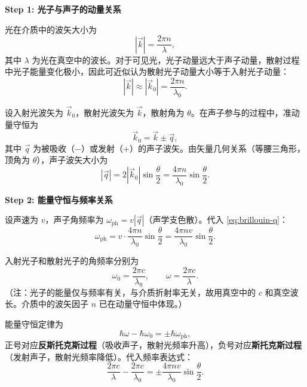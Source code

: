 \begin{derivationbox}[标准解题过程]
\textbf{Step 1: 光子与声子的动量关系}

光在介质中的波矢大小为
\begin{equation}
|\vec k| = \frac{2\pi n}{\lambda},
\end{equation}
其中 $\lambda$ 为光在真空中的波长。对于可见光，光子动量远大于声子动量，散射过程中光子能量变化极小，因此可近似认为散射光子动量大小等于入射光子动量：
\begin{equation}
|\vec k| \approx |\vec k_0| = \frac{2\pi n}{\lambda_0}.
\end{equation}

设入射光波矢为 $\vec k_0$，散射光波矢为 $\vec k$，散射角为 $\theta$。在声子参与的过程中，准动量守恒为
\begin{equation}
\vec k_0 = \vec k \pm \vec q,
\end{equation}
其中 $\vec q$ 为被吸收（$-$）或发射（$+$）的声子波矢。由矢量几何关系（等腰三角形，顶角为 $\theta$），声子波矢大小为
\begin{equation}
|\vec q| = 2|\vec k_0|\sin\frac{\theta}{2} = \frac{4\pi n}{\lambda_0}\sin\frac{\theta}{2}.
\label{eq:brillouin-q}
\end{equation}

\textbf{Step 2: 能量守恒与频率关系}

设声速为 $v$，声子角频率为 $\omega_\mathrm{ph} = v|\vec q|$（声学支色散）。代入 \eqref{eq:brillouin-q}：
\begin{equation}
\omega_\mathrm{ph} = v\cdot\frac{4\pi n}{\lambda_0}\sin\frac{\theta}{2} = \frac{4\pi nv}{\lambda_0}\sin\frac{\theta}{2}.
\end{equation}

入射光子和散射光子的角频率分别为
\begin{equation}
\omega_0 = \frac{2\pi c}{\lambda_0}, \qquad \omega = \frac{2\pi c}{\lambda}.
\end{equation}
（注：光子的能量仅与频率有关，与介质折射率无关，故用真空中的 $c$ 和真空波长。介质中的波矢因子 $n$ 已在动量守恒中体现。）

能量守恒定律为
\begin{equation}
\hbar\omega - \hbar\omega_0 = \pm\hbar\omega_\mathrm{ph},
\end{equation}
正号对应\textbf{反斯托克斯过程}（吸收声子，散射光频率升高），负号对应\textbf{斯托克斯过程}（发射声子，散射光频率降低）。代入频率表达式：
\begin{equation}
\frac{2\pi c}{\lambda} - \frac{2\pi c}{\lambda_0} = \pm\frac{4\pi nv}{\lambda_0}\sin\frac{\theta}{2}.
\end{equation}


\end{derivationbox}
